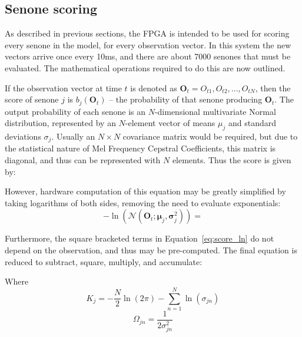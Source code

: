 	\subsection{Senone scoring} %
	\label{sub:senone_scoring}
		As described in previous sections, the FPGA is intended to be used for scoring every senone in the model, for every observation vector.  In this system the new vectors arrive once every 10ms, and there are about 7000 senones that must be evaluated.  The mathematical operations required to do this are now outlined. %

		If the observation vector at time $t$ is denoted as $\textbf{O}_t = {O_{t1}, O_{t2}, ..., O_{tN}}$, then the score of senone $j$ is $b_j(\textbf{O}_t)$ -- the probability of that senone producing $\textbf{O}_t$.  The output probability of each senone is an $N$-dimensional multivariate Normal distribution, represented by an $N$-element vector of means $\mu_j$ and standard deviations $\sigma_j$.  Usually an $N\times N$ covariance matrix  would be required, but due to the statistical nature of Mel Frequency Cepstral Coefficients, this matrix is diagonal, and thus can be represented with $N$ elements.  Thus the score is given by:

		However, hardware computation of this equation may be greatly simplified by taking logarithms of both sides, removing the need to evaluate exponentials:
		\[
		-\ln(\mathcal{N}(\textbf{O}_t; \boldsymbol{\mu}_j,\boldsymbol{\sigma}_j^2)) =
		\]

		Furthermore, the square bracketed terms in Equation~\ref{eq:score_ln} do not depend on the observation, and thus may be pre-computed.  The final equation is reduced to subtract, square, multiply, and accumulate:

		Where
		\[ K_j = - \frac{N}{2} \ln(2\pi) - \sum_{n=1}^N \ln(\sigma_{jn}) \]
		\[ \Omega_{jn} = \frac{1}{2\sigma_{jn}^2} \]

